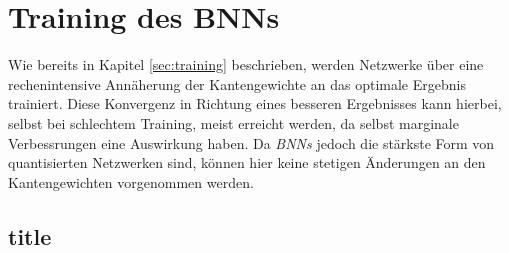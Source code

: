 \chapter{Training des BNNs}
Wie bereits in Kapitel \ref{sec:training} beschrieben, werden Netzwerke über eine rechenintensive Annäherung der Kantengewichte an das optimale Ergebnis trainiert. Diese Konvergenz in Richtung eines besseren Ergebnisses kann hierbei, selbst bei schlechtem Training, meist erreicht werden, da selbst marginale Verbessrungen eine Auswirkung haben. Da \textit{BNNs} jedoch die stärkste Form von quantisierten Netzwerken sind, können hier keine stetigen Änderungen an den Kantengewichten vorgenommen werden.
\section{title}